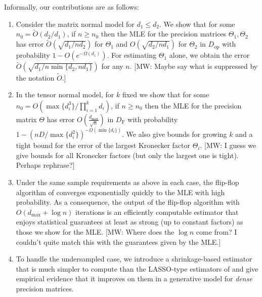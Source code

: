 \documentclass[aos]{imsart}
\theoremstyle{definition}
\numberwithin{equation}{section}
\newcommand{\eps}{\varepsilon}
\newcommand{\DF}{D_{\operatorname{F}}}
\newcommand{\Dop}{D_{\operatorname{op}}}
\newcommand{\DTV}{D_{\operatorname{TV}}}
\def\dmax{d_{\max}}
\newcommand{\CF}[1]{{\color{purple}[CF: #1]}}
\newcommand{\MW}[1]{{\color{red}[MW: #1]}}
\newcommand{\CF}[1]{{}}
\newcommand{\MW}[1]{{}}
\begin{document}
Informally, our contributions are as follows:
\begin{enumerate}
\item Consider the matrix normal model for $d_1 \leq d_2$. We show that for some $n_0 =\widetilde{O}( d_2/d_1)$, if $n \geq n_0$ then the MLE for the precision matrices $\Theta_1, \Theta_2$ has error $\widetilde{O}(\sqrt{{d_1}/{nd_2}})$ for $\Theta_1$ and $O(\sqrt{{d_2}/{nd_1}})$ for $\Theta_2$ in $\Dop$ with probability $1 - O(e^{ - \Omega ( d_1)})$.
For estimating $\Theta_1$ alone, we obtain the error $\widetilde{O}(\sqrt{{d_1}/{n\min\{d_2, n d_1\}}})$ for any $n$.
\MW{Maybe say what is suppressed by the notation $\widetilde{O}$.}
\item In the tensor normal model, for $k$ fixed we show that for some $n_0 = O( \max\{d_i^3\}/ \prod_{i=1}^k d_i)$, if $n \geq n_0$ then the MLE for the precision matrix $\Theta$ has error $O( \frac{\dmax}{\sqrt{n}} )$ in $\DF$ with probability $1 - (n D /\max\{d_i^2\})^{-\Omega(\min\{d_i\})}$.
We also give bounds for growing $k$ and a tight bound for the error of the largest Kronecker factor $\Theta_i$.
\MW{I guess we give bounds for all Kronecker factors (but only the largest one is tight). Perhaps rephrase?}
\item Under the same sample requirements as above in each case, the flip-flop algorithm of \citep{mardia1993spatial,manceur2013maximum} converges exponentially quickly to the MLE with high probability.
As a consequence, the output of the flip-flop algorithm with $O\left(\dmax + \log n \right)$ iterations is an efficiently computable estimator that enjoys statistical guarantees at least as strong (up to constant factors) as those we show for the MLE.
\MW{Where does the $\log n$ come from? I couldn't quite match this with the guarantees given by the MLE.}
\item To handle the undersampled case, we introduce a shrinkage-based estimator that is much simpler to compute than the LASSO-type estimators of \cite{tsiligkaridis2013convergence,sun2015nonconvex,zhou2014gemini} and give empirical evidence that it improves on them in a generative model for \emph{dense} precision matrices.
\end{enumerate}
\end{document}
